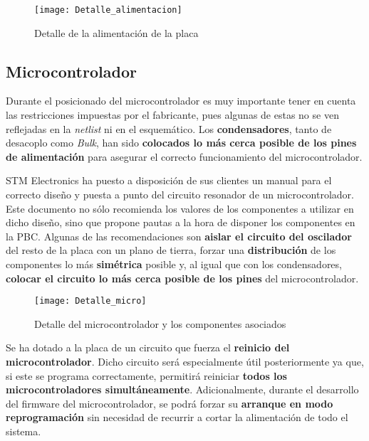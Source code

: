 \begin{figure} [h]
    \centering
    \texttt{[image: Detalle\_alimentacion]}
    \caption{Detalle de la alimentación de la placa}
    \label{fig:Detalle_alimentacion}
\end{figure}

\subsection{Microcontrolador\label{sec:PCB_micro}}

Durante el posicionado del microcontrolador es muy importante tener en cuenta las restricciones impuestas por el fabricante, pues algunas de estas no se ven reflejadas en la \textit{netlist} ni en el esquemático. Los \textbf{condensadores}, tanto de desacoplo como \textit{Bulk}, han sido \textbf{colocados lo más cerca posible de los pines de alimentación} para asegurar el correcto funcionamiento del microcontrolador.

STM Electronics ha puesto a disposición de sus clientes un manual para el correcto diseño y puesta a punto del circuito resonador de un microcontrolador. Este documento no sólo recomienda los valores de los componentes a utilizar en dicho diseño, sino que propone pautas a la hora de disponer los componentes en la PBC. Algunas de las recomendaciones son \textbf{aislar el circuito del oscilador} del resto de la placa con un plano de tierra, forzar una \textbf{distribución} de los componentes lo más \textbf{simétrica} posible y, al igual que con los condensadores, \textbf{colocar el circuito lo más cerca posible de los pines} del microcontrolador.

\clearpage

\begin{figure} [h]
    \centering
    \texttt{[image: Detalle\_micro]}
    \caption{Detalle del microcontrolador y los componentes asociados}
    \label{fig:Detalle_micro}
\end{figure}

Se ha dotado a la placa de un circuito que fuerza el \textbf{reinicio del microcontrolador}. Dicho circuito será especialmente útil posteriormente ya que, si este se programa correctamente, permitirá reiniciar \textbf{todos los microcontroladores simultáneamente}. Adicionalmente, durante el desarrollo del firmware del microcontrolador, se podrá forzar su \textbf{arranque en modo reprogramación} sin necesidad de recurrir a cortar la alimentación de todo el sistema.

